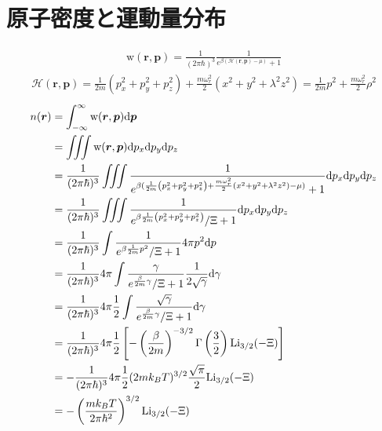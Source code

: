 \documentclass[11pt,a4j,notitlepage]{jreport}
\begin{document}
\chapter{原子密度と運動量分布}
\begin{align}
 	\mathrm{w}(\bm{r}, \bm{p}) = \frac{1}{(2 \pi \hbar)^{3}} \frac{1}{e^{\beta(\mathcal{H}(\bm{r}, \bm{p})-\mu)}+1}
	\label{eq:3}
\end{align}
\begin{align}
 	\mathcal{H}(\bm{r}, \bm{p}) = \frac{1}{2m}\left(p_{x}^{2}+p_{y}^{2}+p_{z}^{2}\right)+\frac{m \omega_{r}^{2}}{2}\left(x^{2}+y^{2}+\lambda^{2} z^{2}\right)
 	= \frac{1}{2m} p^2 + \frac{m \omega_{r}^{2}}{2} \rho^2
	\label{eq:4}
\end{align}
\begin{align}
 	n(\bm{r}) 
 	& = \int_{-\infty}^{\infty} \mathrm{w}(\bm{r}, \bm{p}) \mathrm{d} \bm{p}
 	\notag \\
 	& = \iiint \mathrm{w}(\bm{r}, \bm{p}) \mathrm{d} p_x \mathrm{d} p_y \mathrm{d} p_z
 	\notag \\
 	& = \frac{1}{(2 \pi \hbar)^{3}} \iiint \frac{1}{e^{\beta( \frac{1}{2 m}\left(p_{x}^{2}+p_{y}^{2}+p_{z}^{2}\right)+\frac{m \omega_{r}^{2}}{2}\left(x^{2}+y^{2}+\lambda^{2} z^{2}\right)-\mu)}+1} \mathrm{d} p_x \mathrm{d} p_y \mathrm{d} p_z
 	\notag \\
 	& = \frac{1}{(2 \pi \hbar)^{3}} \iiint \frac{1}{e^{\beta \frac{1}{2 m}\left(p_{x}^{2}+p_{y}^{2}+p_{z}^{2}\right)} / \Xi+1} \mathrm{d} p_x \mathrm{d} p_y \mathrm{d} p_z
 	\notag \\
 	 & = \frac{1}{(2 \pi \hbar)^{3}} \int \frac{1}{e^{ \beta \frac{1}{2 m} p^2 } / \Xi+1} 4\pi p^2 \mathrm{d} p
 	\notag \\
 	& = \frac{1}{(2 \pi \hbar)^{3}} 4\pi \int \frac{\gamma}{e^{\frac{\beta}{2 m} \gamma } / \Xi+1} \frac{1}{2\sqrt{\gamma}}\mathrm{d} \gamma
 	\notag \\
 	& = \frac{1}{(2 \pi \hbar)^{3}} 4\pi \frac{1}{2} \int \frac{\sqrt{\gamma}}{e^{\frac{\beta}{2m} \gamma } / \Xi+1} \mathrm{d} \gamma
 	\notag \\
 	& = \frac{1}{(2 \pi \hbar)^{3}} 4\pi \frac{1}{2} \left[ - \left(\frac{\beta}{2m} \right)^{-3/2} \Gamma \left(\frac{3}{2}\right) \mathrm{Li}_{3/2}(- \Xi )\right]
 	\notag \\
 	& = - \frac{1}{(2 \pi \hbar)^{3}} 4\pi \frac{1}{2} (2mk_{B}T)^{3/2} \frac{\sqrt{\pi}}{2} \mathrm{Li}_{3/2}(- \Xi )
 	\notag \\
 	& = - \left( \frac{mk_{B}T}{2 \pi \hbar^2} \right)^{3/2} \mathrm{Li}_{3/2}(- \Xi )
	\label{eq:5}
\end{align}
\end{document}
